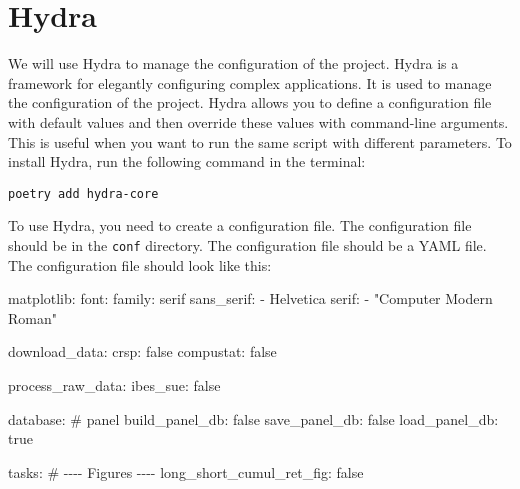 \documentclass[
  letterpaper,
  DIV=11,
  numbers=noendperiod]{scrartcl}
\newenvironment{Shaded}{\begin{snugshade}}{\end{snugshade}}
\newcommand{\AttributeTok}[1]{\textcolor[rgb]{0.40,0.45,0.13}{#1}}
\newcommand{\CharTok}[1]{\textcolor[rgb]{0.13,0.47,0.30}{#1}}
\newcommand{\CommentTok}[1]{\textcolor[rgb]{0.37,0.37,0.37}{#1}}
\newcommand{\FunctionTok}[1]{\textcolor[rgb]{0.28,0.35,0.67}{#1}}
\newcommand{\KeywordTok}[1]{\textcolor[rgb]{0.00,0.23,0.31}{#1}}
\newcommand{\StringTok}[1]{\textcolor[rgb]{0.13,0.47,0.30}{#1}}
\begin{document}
\hypertarget{hydra}{%
\section{Hydra}\label{hydra}}

We will use Hydra to manage the configuration of the project. Hydra is a
framework for elegantly configuring complex applications. It is used to
manage the configuration of the project. Hydra allows you to define a
configuration file with default values and then override these values
with command-line arguments. This is useful when you want to run the
same script with different parameters. To install Hydra, run the
following command in the terminal:

\texttt{poetry\ add\ hydra-core}

To use Hydra, you need to create a configuration file. The configuration
file should be in the \texttt{conf} directory. The configuration file
should be a YAML file. The configuration file should look like this:

\begin{Shaded}
\begin{Highlighting}[]
\FunctionTok{matplotlib}\KeywordTok{:}
\AttributeTok{  }\FunctionTok{font}\KeywordTok{:}
\AttributeTok{    }\FunctionTok{family}\KeywordTok{:}\AttributeTok{ serif}
\AttributeTok{    }\FunctionTok{sans\_serif}\KeywordTok{:}
\AttributeTok{      }\KeywordTok{{-}}\AttributeTok{ Helvetica}
\AttributeTok{    }\FunctionTok{serif}\KeywordTok{:}
\AttributeTok{      }\KeywordTok{{-}}\AttributeTok{ }\StringTok{"Computer Modern Roman"}

\FunctionTok{download\_data}\KeywordTok{:}
\AttributeTok{  }\FunctionTok{crsp}\KeywordTok{:}\AttributeTok{ }\CharTok{false}
\AttributeTok{  }\FunctionTok{compustat}\KeywordTok{:}\AttributeTok{ }\CharTok{false}

\FunctionTok{process\_raw\_data}\KeywordTok{:}
\AttributeTok{  }\FunctionTok{ibes\_sue}\KeywordTok{:}\AttributeTok{ }\CharTok{false}

\FunctionTok{database}\KeywordTok{:}
\CommentTok{  \# panel}
\AttributeTok{  }\FunctionTok{build\_panel\_db}\KeywordTok{:}\AttributeTok{ }\CharTok{false}
\AttributeTok{  }\FunctionTok{save\_panel\_db}\KeywordTok{:}\AttributeTok{ }\CharTok{false}
\AttributeTok{  }\FunctionTok{load\_panel\_db}\KeywordTok{:}\AttributeTok{ }\CharTok{true}

\FunctionTok{tasks}\KeywordTok{:}
\CommentTok{  \# {-}{-}{-}{-} Figures {-}{-}{-}{-}}
\AttributeTok{  }\FunctionTok{long\_short\_cumul\_ret\_fig}\KeywordTok{:}\AttributeTok{ }\CharTok{false}
\end{Highlighting}
\end{Shaded}
\end{document}
